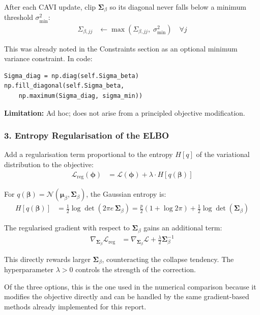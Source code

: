 \documentclass[11pt,a4paper]{article}
\begin{document}
After each CAVI update, clip $\bm{\Sigma}_\beta$ so its diagonal never falls below a minimum threshold $\sigma^2_{\min}$:
\begin{align}
  \Sigma_{\beta,jj} &\leftarrow \max\!\left(\Sigma_{\beta,jj},\; \sigma^2_{\min}\right) \quad \forall j
\end{align}

This was already noted in the Constraints section as an optional minimum variance constraint. In code:
\begin{verbatim}
Sigma_diag = np.diag(self.Sigma_beta)
np.fill_diagonal(self.Sigma_beta,
    np.maximum(Sigma_diag, sigma_min))
\end{verbatim}

\textbf{Limitation:} Ad hoc; does not arise from a principled objective modification.

\subsubsection*{3. Entropy Regularisation of the ELBO}

Add a regularisation term proportional to the entropy $H[q]$ of the variational distribution to the objective:
\begin{align}
  \mathcal{L}_{\text{reg}}(\bm{\phi}) &= \mathcal{L}(\bm{\phi}) + \lambda \cdot H[q(\bm{\beta})]
\end{align}

For $q(\bm{\beta}) = \mathcal{N}(\bm{\mu}_\beta, \bm{\Sigma}_\beta)$, the Gaussian entropy is:
\begin{align}
  H[q(\bm{\beta})] &= \frac{1}{2} \log \det(2\pi e\, \bm{\Sigma}_\beta)
               = \frac{p}{2}(1 + \log 2\pi) + \frac{1}{2}\log\det(\bm{\Sigma}_\beta)
\end{align}

The regularised gradient with respect to $\bm{\Sigma}_\beta$ gains an additional term:
\begin{align}
  \nabla_{\bm{\Sigma}_\beta} \mathcal{L}_{\text{reg}} &= \nabla_{\bm{\Sigma}_\beta} \mathcal{L} + \frac{\lambda}{2} \bm{\Sigma}_\beta^{-1}
\end{align}

This directly rewards larger $\bm{\Sigma}_\beta$, counteracting the collapse tendency. The hyperparameter $\lambda > 0$ controls the strength of the correction.

Of the three options, this is the one used in the numerical comparison because it modifies the objective directly and can be handled by the same gradient-based methods already implemented for this report.
\end{document}
